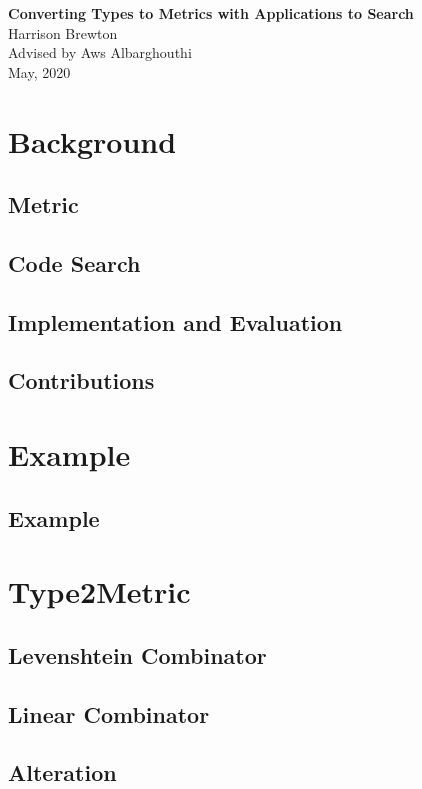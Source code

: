 \documentclass[12pt]{article}
\theoremstyle{plain}
\begin{document}
{\centering \Huge \textbf{Converting Types to Metrics with Applications to Search} \\ 
\vspace{0.5cm}
\Large
Harrison Brewton \\
Advised by Aws Albarghouthi \\ 
May, 2020 \\
}

\section{Background}
\subsection{Metric}

\subsection{Code Search}

\subsection{Implementation and Evaluation}

\subsection{Contributions}

\section{Example}

\subsection{Example}

\section{Type2Metric}

\subsection{Levenshtein Combinator}

\subsection{Linear Combinator}

\subsection{Alteration}

\end{document}
